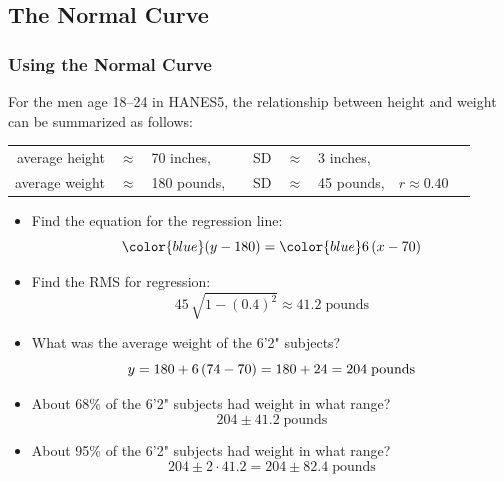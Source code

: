 \documentclass[t]{beamer}
\begin{document}
\subsection{The Normal Curve}
\begin{frame}
\frametitle{Using the Normal Curve}

\footnotesize

For the men age 18--24 in HANES5, the relationship between height and 
weight can be summarized as follows:\vspace{-3pt}
\begin{center}
{\setlength{\tabcolsep}{2pt}\begin{tabular}{rclcrclcc}
average height & $\approx$ & 70 inches, & \hspace{5pt} & SD & $\approx$ & 3 inches,\\
average weight & $\approx$ & 180 pounds, & \hspace{5pt} & SD & $\approx$ & 45 pounds, &
   \hspace{10pt} $r\approx 0.40$\\[-8pt]
\end{tabular}}
\end{center}
\begin{itemize}
\item<2-> Find the equation for the regression line:\vspace{-5pt}
\[{\color{blue}  (y - 180)} = {\color{blue}6\,(x - 70)}\vspace{-8pt}\]
\item<3-> Find the RMS for regression:
\[45\,\sqrt{1 - (0.4)^2} \approx 41.2\;\mbox{pounds}\]
\item<4-> What was the average weight of the 6'2" subjects?
    \[y = 180 + 6\,(74 - 70) = 180 + 24 = 204\;\mbox{pounds}\vspace{-5pt}\]  
\item<5-> About 68\% of the 6'2" subjects had weight in what range?\vspace{-4pt}
 \[204\pm 41.2\;\mbox{pounds}\]
\item<6-> About 95\% of the 6'2" subjects had weight in what range?\vspace{-4pt}
 \[204\pm 2\cdot 41.2 = 204\pm 82.4\;\mbox{pounds}\]
\end{itemize}
\label{lastpage}
\end{frame}
\end{document}
